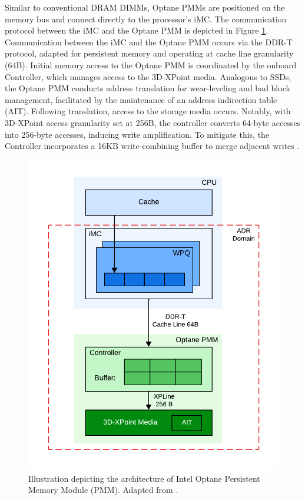 Similar to conventional DRAM DIMMs, Optane PMMs are positioned on the memory bus and connect directly to the processor's iMC. The communication protocol between the iMC and the Optane PMM is depicted in Figure \ref{fig:optane_communication}.  Communication between the iMC and the Optane PMM occurs via the DDR-T protocol, adapted for persistent memory and operating at cache line granularity (64B). Initial memory access to the Optane PMM is coordinated by the onboard Controller, which manages access to the 3D-XPoint media. Analogous to SSDs, the Optane PMM conducts address translation for wear-leveling and bad block management, facilitated by the maintenance of an address indirection table (AIT). Following translation, access to the storage media occurs. Notably, with 3D-XPoint access granularity set at 256B, the controller converts 64-byte accesses into 256-byte accesses, inducing write amplification. To mitigate this, the Controller incorporates a 16KB write-combining buffer to merge adjacent writes \cite{yang2020empirical,izraelevitz2019basic,wu2020ribbon}.

\begin{figure}[ht]
    \centering
    \includegraphics[scale=0.7]{images/optane-communication.png}
    \caption[Intel Optane Persistent Memory Module Architecture]{Illustration depicting the architecture of Intel Optane Persistent Memory Module (PMM). Adapted from \cite{yang2020empirical}.}
    \label{fig:optane_communication}
\end{figure}


